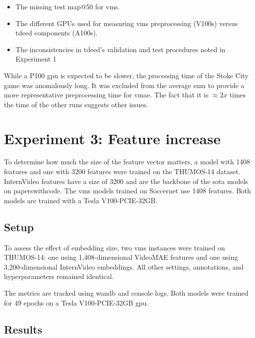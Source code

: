 \begin{itemize}
    \item The missing test \acrshort{map}@50 for \acrshort{vms}.
    \item The different GPUs used for measuring \acrshort{vms} preprocessing (V100s) versus \acrshort{tdeed} components (A100s).
    \item The inconsistencies in \acrshort{tdeed}'s validation and test procedures noted in Experiment 1
\end{itemize}


While a P100 \acrshort{gpu} is expected to be slower, the processing time of the Stoke City game was anomalously long. It was excluded from the average sum to provide a more representative preprocessing time for \acrshort{vmae}. The fact that it is $\approx2x$ times the time of the other runs suggests other issues. 

\section{Experiment 3: Feature increase}
\label{sec:experiment3}
To determine how much the size of the feature vector matters, a model with 1408 features and one with 3200 features were trained on the THUMOS-14 dataset.
InternVideo features have a size of 3200 and are the backbone of the \acrshort{sota} models on paperswithcode. The \acrshort{vms} models trained on Soccernet use 1408 features. Both models are trained with a Tesla V100-PCIE-32GB.


\subsection{Setup}
\label{ssec:ex3_setup}

To assess the effect of embedding size, two \acrshort{vms} instances were trained on THUMOS-14\cite{dataset:thumos}: one using 1,408-dimensional VideoMAE features and one using 3,200-dimensional InternVideo embeddings. All other settings, annotations, and hyperparameters remained identical.

The metrics are tracked using \acrlong{wandb} and console logs.
Both models were trained for 49 epochs on a Tesla V100-PCIE-32GB \acrshort{gpu}.

\subsection{Results}
\label{ssec:ex3_results}

